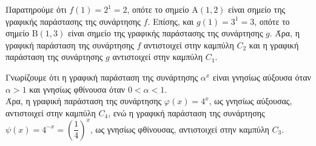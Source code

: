 \begin{alist}
\item Παρατηρούμε ότι $f(1) = 2^1 = 2$, οπότε το σημείο $\text{A}(1,2)$ είναι σημείο της γραφικής παράστασης της συνάρτησης $f$. Επίσης, και $g(1) = 3^1 = 3$, οπότε το σημείο $\text{B}(1,3)$ είναι σημείο της γραφικής παράστασης της συνάρτησης $g$. Άρα, η γραφική παράσταση της συνάρτησης $f$ αντιστοιχεί στην καμπύλη $C_2$ και η γραφική παράσταση της συνάρτησης $g$ αντιστοιχεί στην καμπύλη $C_1$.
\begin{center}
\end{center}
\item Γνωρίζουμε ότι η γραφική παράσταση της συνάρτησης $\alpha^x$ είναι γνησίως αύξουσα όταν $\alpha > 1$ και γνησίως φθίνουσα όταν $0 < \alpha < 1$. \\
Άρα, η γραφική παράσταση της συνάρτησης $\varphi(x) = 4^x$, ως γνησίως αύξουσας, αντιστοιχεί στην καμπύλη $C_4$, ενώ η γραφική παράσταση της συνάρτησης $\psi(x) = 4^{-x} = \left(\dfrac{1}{4}\right)^x$, ως γνησίως φθίνουσας, αντιστοιχεί στην καμπύλη $C_3$.
\begin{center}
\end{center}
\end{alist}

